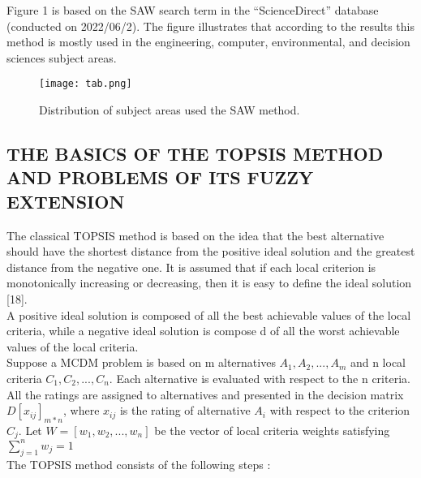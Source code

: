 \documentclass[12pt,a4paper]{article}
\begin{document}
Figure 1  is based on the SAW search term in the “ScienceDirect” database (conducted on 2022/06/2). The figure illustrates that according to the results this method is mostly used in the engineering, computer, environmental, and decision sciences subject areas.

\begin{figure}
    \centering
    \texttt{[image: tab.png]}
    \caption{Distribution of subject areas used the SAW method.}

\end{figure}

\subsection{THE BASICS OF THE TOPSIS METHOD AND PROBLEMS OF ITS FUZZY EXTENSION}

\hspace{1em}The classical TOPSIS method is based on the idea that the best alternative should have the shortest distance from the positive ideal solution and the greatest distance from the negative one. It is assumed that if each local criterion is monotonically increasing or decreasing, then it is easy to define the ideal solution [18].\\

A positive ideal solution is composed of all the best achievable values of the local criteria, while a negative ideal solution is compose d of all the worst achievable values of the local criteria.\\

Suppose a MCDM problem is based on m alternatives $A_{1}, A_{2}, ... , A_{m}$ and n local criteria $C_{1},C_{2}, ... , C_{n}$. Each alternative is evaluated with respect to the n criteria. All the ratings are assigned to alternatives and presented in the decision matrix $D[x_{ij}]_{m*n}$, where $x_{ij}$ is the rating of alternative $A_{i}$ with respect to the criterion $C_{j}$. Let $W = [w_{1}, w_{2}, ... , w_{n}]$ be the vector of local criteria weights satisfying $\sum\limits^{n}_{j=1}w_{j}=1$\\
The TOPSIS method consists of the following steps :
\end{document}
